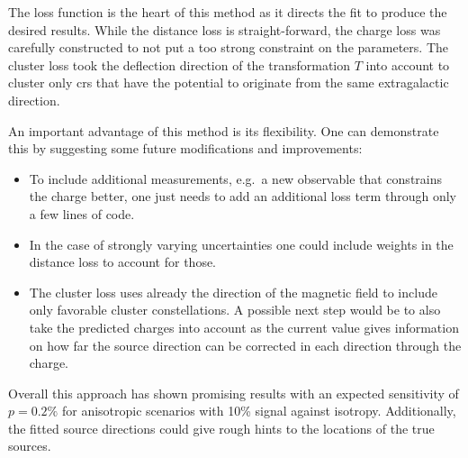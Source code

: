 The loss function is the heart of this method as it directs the fit to produce the desired results. While the distance loss is straight-forward, the charge loss was carefully constructed to not put a too strong constraint on the parameters. The cluster loss took the deflection direction of the transformation \(T\) into account to cluster only \glspl{cr} that have the potential to originate from the same extragalactic direction.

An important advantage of this method is its flexibility. One can demonstrate this by suggesting some future modifications and improvements:
\begin{itemize}
    \item To include additional measurements, e.g.\ a new observable that constrains the charge better, one just needs to add an additional loss term through only a few lines of code.
    \item In the case of strongly varying uncertainties one could include weights in the distance loss to account for those.
    \item The cluster loss uses already the direction of the magnetic field to include only favorable cluster constellations. A possible next step would be to also take the predicted charges into account as the current value gives information on how far the source direction can be corrected in each direction through the charge.
\end{itemize}

Overall this approach has shown promising results with an expected sensitivity of \(p=0.2 \%{}\) for anisotropic scenarios with 10\% signal against isotropy. Additionally, the fitted source directions could give rough hints to the locations of the true sources.
